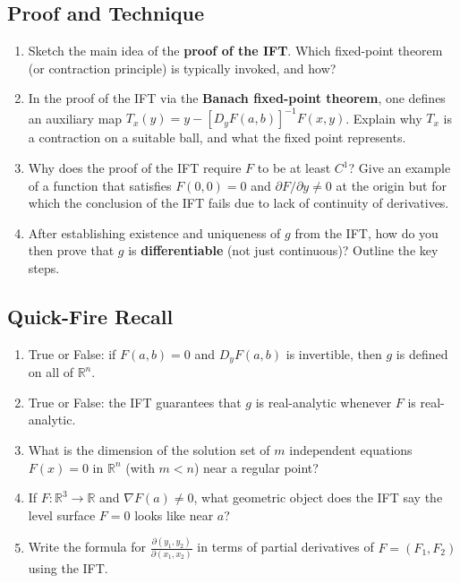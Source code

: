 \subsection{Proof and Technique}

\begin{enumerate}[resume, leftmargin=*, label=\textbf{Q\arabic*.}]

\item Sketch the main idea of the \textbf{proof of the IFT}. Which fixed-point theorem (or contraction principle) is typically invoked, and how?

\item In the proof of the IFT via the \textbf{Banach fixed-point theorem}, one defines an auxiliary map $T_x(y) = y - [D_y F(a,b)]^{-1} F(x,y)$. Explain why $T_x$ is a contraction on a suitable ball, and what the fixed point represents.

\item Why does the proof of the IFT require $F$ to be at least $C^1$? Give an example of a function that satisfies $F(0,0) = 0$ and $\partial F/\partial y \neq 0$ at the origin but for which the conclusion of the IFT fails due to lack of continuity of derivatives.

\item After establishing existence and uniqueness of $g$ from the IFT, how do you then prove that $g$ is \textbf{differentiable} (not just continuous)? Outline the key steps.

\end{enumerate}

\subsection{Quick-Fire Recall}

\begin{enumerate}[resume, leftmargin=*, label=\textbf{Q\arabic*.}]

\item True or False: if $F(a,b) = 0$ and $D_y F(a,b)$ is invertible, then $g$ is defined on all of $\mathbb{R}^n$.

\item True or False: the IFT guarantees that $g$ is real-analytic whenever $F$ is real-analytic.

\item What is the dimension of the solution set of $m$ independent equations $F(x) = 0$ in $\mathbb{R}^n$ (with $m < n$) near a regular point?

\item If $F : \mathbb{R}^3 \to \mathbb{R}$ and $\nabla F(a) \neq 0$, what geometric object does the IFT say the level surface $F = 0$ looks like near $a$?

\item Write the formula for $\frac{\partial(y_1, y_2)}{\partial(x_1, x_2)}$ in terms of partial derivatives of $F = (F_1, F_2)$ using the IFT.

\end{enumerate}
